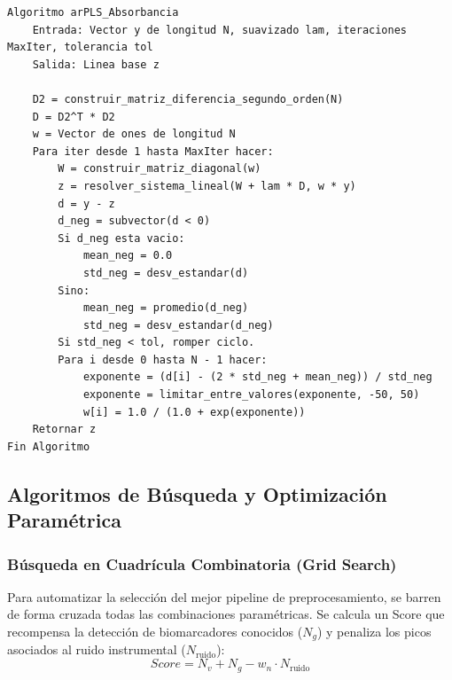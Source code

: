\begin{lstlisting}[caption=Algoritmo arPLS (Absorbancia)]
Algoritmo arPLS_Absorbancia
    Entrada: Vector y de longitud N, suavizado lam, iteraciones MaxIter, tolerancia tol
    Salida: Linea base z

    D2 = construir_matriz_diferencia_segundo_orden(N)
    D = D2^T * D2
    w = Vector de ones de longitud N
    Para iter desde 1 hasta MaxIter hacer:
        W = construir_matriz_diagonal(w)
        z = resolver_sistema_lineal(W + lam * D, w * y)
        d = y - z
        d_neg = subvector(d < 0)
        Si d_neg esta vacio:
            mean_neg = 0.0
            std_neg = desv_estandar(d)
        Sino:
            mean_neg = promedio(d_neg)
            std_neg = desv_estandar(d_neg)
        Si std_neg < tol, romper ciclo.
        Para i desde 0 hasta N - 1 hacer:
            exponente = (d[i] - (2 * std_neg + mean_neg)) / std_neg
            exponente = limitar_entre_valores(exponente, -50, 50)
            w[i] = 1.0 / (1.0 + exp(exponente))
    Retornar z
Fin Algoritmo
\end{lstlisting}

\subsection{Algoritmos de Búsqueda y Optimización Paramétrica}

\subsubsection{Búsqueda en Cuadrícula Combinatoria (Grid Search)}
Para automatizar la selección del mejor pipeline de preprocesamiento, se barren de forma cruzada todas las combinaciones paramétricas. Se calcula un Score que recompensa la detección de biomarcadores conocidos ($N_g$) y penaliza los picos asociados al ruido instrumental ($N_{\text{ruido}}$):
\begin{equation}
    Score = N_v + N_g - w_n \cdot N_{\text{ruido}}
\end{equation}


